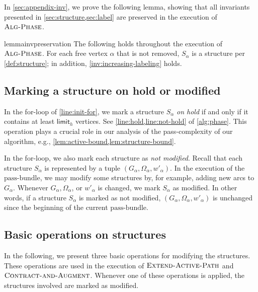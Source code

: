 \documentclass{article}
\newcommand{\alp}{\alpha}
\newcommand{\Omg}{\Omega}
\newcommand{\bundle}{\text{pass-bundle}\xspace}
\newcommand{\limit}{\mathsf{limit}}
\newcommand{\algPhase}{\textsc{Alg-Phase}\xspace}
\newcommand{\algExtend}{\textsc{Extend-Active-Path}\xspace}
\newcommand{\algCheck}{\textsc{Contract-and-Augment}\xspace}
\begin{document}
In \cref{sec:appendix-inv}, we prove the following lemma, showing that all invariants presented in \cref{sec:structure,sec:label} are preserved in the execution of $\algPhase$.

\begin{restatable}{lemma}{invpreservation}
\label{lem:inv-preservation} The following holds throughout the execution of $\algPhase$. For each free vertex $\alp$ that is not removed, $S_\alp$ is a structure per \cref{def:structure}; in addition, \cref{inv:increasing-labeling} holds.
\end{restatable}

\subsection{Marking a structure on hold or modified} \label{sec:marking}
In the for-loop of \cref*{line:init-for}, we mark a structure $S_\alp$ \textit{on hold} if and only if it contains at least $\limit_h$ vertices.
See \cref*{line:hold,line:not-hold} of \cref{alg:phase}.
This operation plays a crucial role in our analysis of the pass-complexity of our algorithm, e.g., \cref{lem:active-bound,lem:structure-bound}.

In the for-loop, we also mark each structure as \textit{not modified}.
Recall that each structure $S_\alp$ is represented by a tuple $(G_\alp, \Omg_\alp, w'_\alp)$.
In the execution of the $\bundle$, we may modify some structures by, for example, adding new arcs to $G_\alp$.
Whenever $G_\alp, \Omg_\alp$, or $w'_\alp$ is changed, we mark $S_\alp$ as modified.
In other words, if a structure $S_\alp$ is marked as not modified, $(G_\alp, \Omg_\alp, w'_\alp)$ is unchanged since the beginning of the current $\bundle$.


\subsection{Basic operations on structures} \label{sec:basic-operations}
In the following, we present three basic operations for modifying the structures. These operations are used in the execution of $\algExtend$ and $\algCheck$. Whenever one of these operations is applied, the structures involved are marked as modified.
\end{document}
